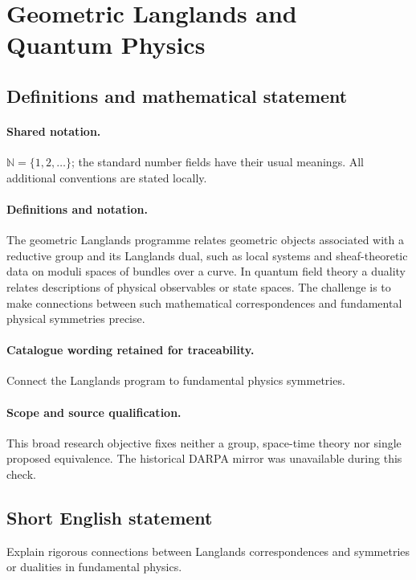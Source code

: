 \documentclass[11pt]{article}
\begin{document}
\section{Geometric Langlands and Quantum Physics}\label{statement}

\subsection{Definitions and mathematical statement}

\paragraph{Shared notation.}$\mathbb N=\{1,2,\ldots\}$; the standard number fields have their usual meanings. All additional conventions are stated locally.


\paragraph{Definitions and notation.}The geometric Langlands programme relates geometric objects associated with a reductive group and its Langlands dual, such as local systems and sheaf-theoretic data on moduli spaces of bundles over a curve. In quantum field theory a duality relates descriptions of physical observables or state spaces. The challenge is to make connections between such mathematical correspondences and fundamental physical symmetries precise.

\paragraph{Catalogue wording retained for traceability.}
Connect the Langlands program to fundamental physics symmetries.
\paragraph{Scope and source qualification.}This broad research objective fixes neither a group, space-time theory nor single proposed equivalence. The historical DARPA mirror was unavailable during this check.
\subsection{Short English statement}
Explain rigorous connections between Langlands correspondences and symmetries or dualities in fundamental physics.
\end{document}
